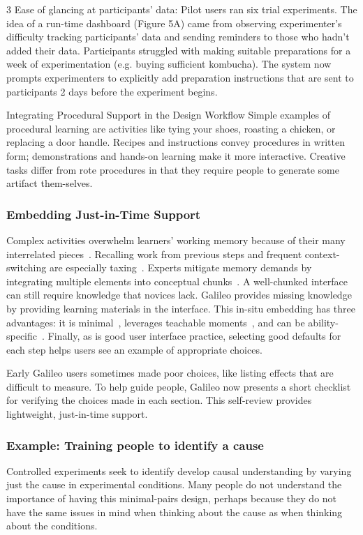 3 Ease of glancing at participants’ data: Pilot users ran six trial experiments. The idea of a run-time dashboard (Figure 5A) came from observing experimenter’s difficulty tracking participants’ data and sending reminders to those who hadn’t added their data. Participants struggled with making suitable preparations for a week of experimentation (e.g. buying sufficient kombucha). The system now prompts experimenters to explicitly add preparation instructions that are sent to participants 2 days before the experiment begins. 

Integrating Procedural Support in the Design Workflow
Simple examples of procedural learning are activities like tying your shoes, roasting a chicken, or replacing a door handle. Recipes and instructions convey procedures in written form; demonstrations and hands-on learning make it more interactive. Creative tasks differ from rote procedures in that they require people to generate some artifact them-selves.

\subsubsection{Embedding Just-in-Time Support}
Complex activities overwhelm learners’ working memory because of their many interrelated pieces~\cite{Engle2002}. Recalling work from previous steps and frequent context-switching are especially taxing~\cite{Gonzalez2004}. Experts mitigate memory demands by integrating multiple elements into conceptual chunks~\cite{Chase1973}. A well-chunked interface can still require knowledge that novices lack. Galileo provides missing knowledge by providing learning materials in the interface. This in-situ embedding has three advantages: it is minimal~\cite{Carroll1987}, leverages teachable moments~\cite{Havighurst1953}, and can be ability-specific~\cite{Corbett1997}. Finally, as is good user interface practice, selecting good defaults for each step helps users see an example of appropriate choices. 

Early Galileo users sometimes made poor choices, like listing effects that are difficult to measure. To help guide people, Galileo now presents a short checklist for verifying the choices made in each section. This self-review provides lightweight, just-in-time support.

\subsubsection{Example: Training people to identify a cause}
Controlled experiments seek to identify develop causal understanding by varying just the cause in experimental conditions. Many people do not understand the importance of having this minimal-pairs design, perhaps because they do not have the same issues in mind when thinking about the cause as when thinking about the conditions.

